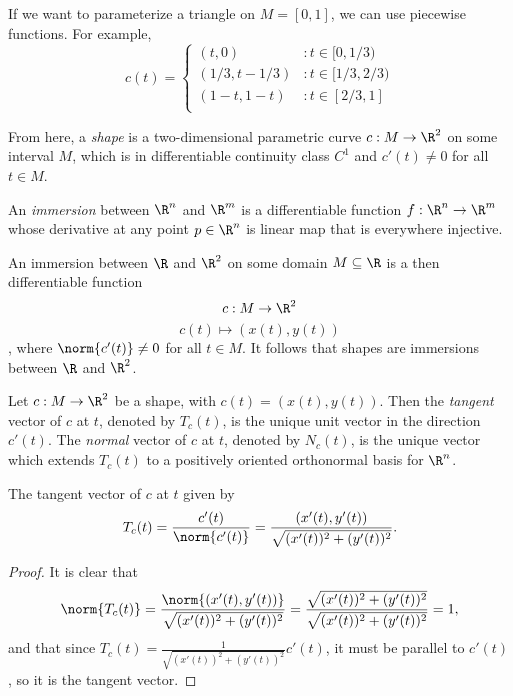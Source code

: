 \documentclass[12pt]{article}
\begin{document}
\begin{exmp}
    If we want to parameterize a triangle on $M = [0, 1]$, we can use piecewise functions. For example,
    \[c(t) = \left\{
        \begin{array}{ll}
          (t, 0) & : t \in [0, 1/3)\\
          (1/3, t - 1/3) & : t \in [1/3, 2/3)\\
          (1 - t, 1 - t) & : t \in [2/3, 1]\\
        \end{array}
      \right.
    \]
\end{exmp}

\begin{defn}
    From here, a \emph{shape} is a two-dimensional parametric curve $c: M \to \R^2$ on some interval $M$, which is in differentiable continuity class $C^1$ and $c'(t) \neq 0$ for all $t \in M$.
\end{defn}

\begin{defn}
    An \emph{immersion} between $\R^n$ and $\R^m$ is a differentiable function $f: \R^n \to \R^m$ whose derivative at any point $p \in \R^n$ is linear map that is everywhere injective.
\end{defn}

\begin{rmk}
    An immersion between $\R$ and $\R^2$ on some domain $M \subseteq \R$ is a then differentiable function \[c: M \to \R^2\] \[c(t) \mapsto (x(t), y(t))\], where $\norm{c'(t)} \neq 0$ for all $t \in M$. It follows that shapes are immersions between $\R$ and $\R^2$.
\end{rmk}

\begin{defn}
    Let $c: M \to \R^2$ be a shape, with $c(t) = (x(t), y(t))$. Then the \emph{tangent} vector of $c$ at $t$, denoted by $T_c(t)$, is the unique unit vector in the direction $c'(t)$. The \emph{normal} vector of $c$ at $t$, denoted by $N_c(t)$, is the unique vector which extends $T_c(t)$ to a positively oriented orthonormal basis for $\R^n$.
\end{defn}

\begin{prop}
    The tangent vector of $c$ at $t$ given by \[T_c(t) = \frac{c'(t)}{\norm{c'(t)}} = \frac{(x'(t), y'(t))}{\sqrt{(x'(t))^2 + (y'(t))^2}}.\]
\end{prop}

\begin{proof}
    It is clear that \[\norm{T_c(t)} = \frac{\norm{(x'(t), y'(t))}}{\sqrt{(x'(t))^2 + (y'(t))^2}} = \frac{\sqrt{(x'(t))^2 + (y'(t))^2}}{\sqrt{(x'(t))^2 + (y'(t))^2}} = 1,\] and that since $T_c(t) = \frac{1}{\sqrt{(x'(t))^2 + (y'(t))^2}}c'(t)$, it must be parallel to $c'(t)$, so it is the tangent vector.
\end{proof}
\end{document}
